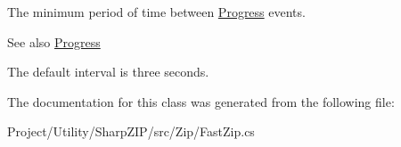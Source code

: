 The minimum period of time between \hyperlink{class_i_c_sharp_code_1_1_sharp_zip_lib_1_1_zip_1_1_fast_zip_events_ad53701f02850d1e5939d1b7638bb5e71}{Progress} events.

\begin{DoxySeeAlso}{See also}
\hyperlink{class_i_c_sharp_code_1_1_sharp_zip_lib_1_1_zip_1_1_fast_zip_events_ad53701f02850d1e5939d1b7638bb5e71}{Progress}


\end{DoxySeeAlso}


The default interval is three seconds.

The documentation for this class was generated from the following file\+:\begin{DoxyCompactItemize}
\item 
Project/\+Utility/\+Sharp\+Z\+I\+P/src/\+Zip/Fast\+Zip.\+cs\end{DoxyCompactItemize}
